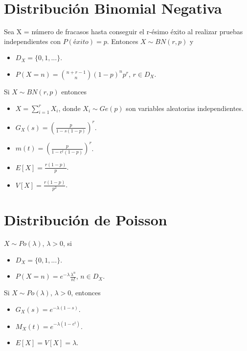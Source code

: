 \section{Distribución Binomial Negativa}

\begin{defi}
Sea X = número de fracasos hasta conseguir el r-ésimo éxito al realizar pruebas independientes con $P(éxito) = p$. Entonces $X \sim BN(r,p)$ y 
\begin{itemize}
    \item $D_X = \{0,1,...\}$.
    \item $P(X = n) = \binom{n + r - 1}{n}(1 - p)^np^r$, $r \in D_X$.
\end{itemize}
\end{defi}

\begin{obs}
Si $X \sim BN(r,p)$ entonces
\begin{itemize}
    \item $X = \sum_{i=1}^{r}{X_i}$, donde $X_i \sim Ge(p)$ son variables aleatorias independientes.
    \item $G_X(s) = \left(\frac{p}{1 - s(1 - p)}\right)^r$.
    \item $m(t) = \left(\frac{p}{1 - e^t(1 - p)}\right)^r$.
    \item $E[X] = \frac{r(1 - p)}{p}$.
    \item $V[X] = \frac{r(1 - p)}{p^2}$.
\end{itemize}
\end{obs}

\section{Distribución de Poisson}

\begin{defi}
$X \sim Po(\lambda)$, $\lambda > 0$, si
\begin{itemize}
    \item $D_X = \{0,1,...\}$.
    \item $P(X = n) = e^{-\lambda}\frac{\lambda^n}{n!}$, $n \in D_X$.
\end{itemize}
\end{defi}

\begin{obs}
Si $X \sim Po(\lambda)$, $\lambda > 0$, entonces
\begin{itemize}
    \item $G_X(s) = e^{-\lambda(1 - s)}$.
    \item $M_X(t) = e^{-\lambda(1 - e^t)}$.
    \item $E[X] = V[X] = \lambda$.
\end{itemize}
\end{obs}

